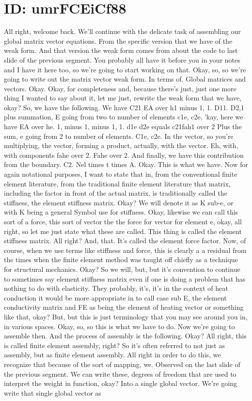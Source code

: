 \documentclass[10pt]{article}
\begin{document}
\section*{ID: umrFCEiCf88}
All right, welcome back. We'll continue with the delicate task of assembling our global matrix vector equations. From the specific version that we have of the weak form. And that version the weak form comes from about the code to last slide of the previous segment. You probably all have it before you in your notes and I have it here too, so we're going to start working on that. Okay, so, so we're going to write out the matrix vector weak form. In terms of. Global matrices and vectors. Okay. Okay, for completeness and, because there's just, just one more thing I wanted to say about it, let me just, rewrite the weak form that we have, okay? So, we have the following. We have C21 EA over h1 minus 1, 1. D11. D2,1 plus summation, E going from two to number of elements c1e, c2e, 'kay, here we have EA over he. 1, minus 1, minus 1, 1. d1e d2e equals c21fah1 over 2 Plus the sum, e going from 2 to number of elements. C1e, c2e. In the vector, so you're multiplying, the vector, forming a product, actually, with the vector. Eh, with, with components fahe over 2. Fahe over 2. And finally, we have this contribution from the boundary. C2. Nel times t times A. Okay. This is what we have. Now for again notational purposes, I want to state that in, from the conventional finite element literature, from the traditional finite element literature that matrix, including the factor in front of the actual matrix, is traditionally called the stiffness, the element stiffness matrix. Okay? We will denote it as K sub-e, or with K being a general Symbol use for stiffness. Okay, likewise we can call this sort of a force, this sort of vector the the force for vector for element e, okay, all right, so let me just state what these are called. This thing is called the element stiffness matrix. All right? And, that. It's called the element force factor. Now, of course, when we use terms like stiffness and force, this is clearly a a residual from the times when the finite element method was taught off chiefly as a technique for structural mechanics. Okay? So we will, but, but it's convention to continue to sometimes say element stiffness matrix even if one is doing a problem that has nothing to do with elasticity. They probably, it's, it's in the context of heat conduction it would be more appropriate in to call case sub E, the element conductivity matrix and FE as being the element of heating vector or something like that, okay? But, but this is just terminology that you may see around you in, in various spaces. Okay, so, so this is what we have to do. Now we're going to assemble then. And the process of assembly is the following. Okay? All right, this is called finite element assembly, right? So it's often referred to not just as assembly, but as finite element assembly. All right in order to do this, we recognize that because of the sort of mapping, we. Observed on the last slide of the previous segment. We can write these, degrees of freedom that are used to interpret the weight in function, okay? Into a single global vector. We're going write that single global vector as 
\end{document}
